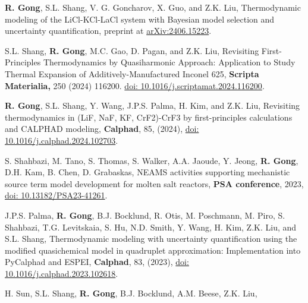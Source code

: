 
\begin{etaremune}


\item \textbf{R. Gong}, S.L. Shang, V. G. Goncharov, X. Guo, and Z.K. Liu, Thermodynamic modeling of the LiCl-KCl-LaCl system with Bayesian model selection and uncertainty quantification, preprint at
\href{https://arxiv.org/abs/2406.15223}
{arXiv:2406.15223}.
\item S.L. Shang, \textbf{R. Gong}, M.C. Gao, D. Pagan, and Z.K. Liu,
Revisiting First-Principles Thermodynamics by Quasiharmonic Approach: Application to Study Thermal Expansion of Additively-Manufactured Inconel 625,
\textbf{Scripta Materialia,} 250 (2024) 116200.
\href{https://doi.org/10.1016/j.scriptamat.2024.116200}
{doi: 10.1016/j.scriptamat.2024.116200}.
\item \textbf{R. Gong}, S.L. Shang, Y. Wang, J.P.S. Palma, H. Kim, and Z.K. Liu, 
Revisiting thermodynamics in (LiF, NaF, KF, CrF2)-CrF3 by first-principles calculations and CALPHAD modeling,
\textbf{Calphad}, 85, (2024),
\href{https://doi.org/10.1016/j.calphad.2024.102703}
{doi: 10.1016/j.calphad.2024.102703}.
\item S. Shahbazi, M. Tano, S. Thomas, S. Walker, A.A. Jaoude, Y. Jeong, \textbf{R. Gong}, D.H. Kam, B. Chen, D. Grabaskas,
NEAMS activities supporting mechanistic source term model development for molten salt reactors,
\textbf{PSA conference}, 2023,
\href{https://doi.org/10.13182/PSA23-41261}
{doi: 10.13182/PSA23-41261}.
\item J.P.S. Palma, \textbf{R. Gong}, B.J. Bocklund, R. Otis, M. Poschmann, M. Piro, S. Shahbazi, T.G. Levitskaia, S. Hu,  N.D. Smith, Y. Wang, H. Kim, Z.K. Liu, and S.L. Shang, 
Thermodynamic modeling with uncertainty quantification using the modified quasichemical model in quadruplet approximation: Implementation into PyCalphad and ESPEI,  
\textbf{Calphad}, 83, (2023),
\href{https://doi.org/10.1016/j.calphad.2023.102618}
{doi: 10.1016/j.calphad.2023.102618}.
\item H. Sun, S.L. Shang, \textbf{R. Gong}, B.J. Bocklund, A.M. Beese, Z.K. Liu, 

\end{etaremune}

